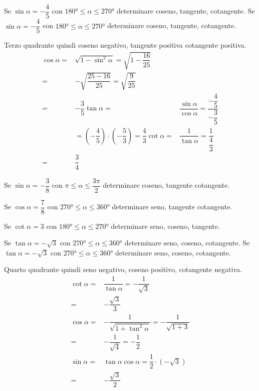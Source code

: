\begin{exercise}
	Se $\sin\alpha=-\dfrac{4}{5}$ con $\ang{180}\leq\alpha\leq\ang{270}$ determinare  coseno, tangente, cotangente.
	\tcblower	
Se $\sin\alpha=-\dfrac{4}{5}$ con $\ang{180}\leq\alpha\leq\ang{270}$ determinare  coseno, tangente, cotangente.
	
Terzo quadrante quindi coseno negativo, tangente positiva cotangente positiva.
	\begin{align*}
	\cos\alpha=&\sqrt{1-\sin^2\alpha}=\sqrt{1-\dfrac{16}{25}}\\
	=&-\sqrt{\dfrac{25-16}{25}}=\sqrt{\dfrac{9}{25}}\\
	=&-\dfrac{3}{5}
	\tan\alpha=&\dfrac{\sin\alpha}{\cos\alpha}=\dfrac{-\dfrac{4}{5}}{-\dfrac{3}{5}}\\
	&=\left(-\dfrac{4}{5}\right)\cdot\left(-\dfrac{5}{3}\right)=\dfrac{4}{3}
	\cot\alpha=&\dfrac{1}{\tan\alpha}=\dfrac{1}{\dfrac{4}{3}}\\
	=&\dfrac{3}{4}
	\end{align*}	
\end{exercise}
\begin{exercise}[no solution]
	Se $\sin\alpha=-\dfrac{3}{8}$  con $\pi\leq\alpha\leq\dfrac{3\pi}{2}$ determinare coseno, tangente cotangente.
\end{exercise}
\begin{exercise}[no solution]
	Se $\cos\alpha=\dfrac{7}{8}$  con $\ang{270}\leq\alpha\leq\ang{360}$ determinare seno, tangente cotangente.
\end{exercise}
\begin{exercise}[no solution]
	Se $\cot\alpha=3$ con $\ang{180}\leq\alpha\leq\ang{270}$ determinare seno, coseno, tangente.
\end{exercise}
\begin{exercise}
	Se $\tan\alpha=-\sqrt{3}$ con $\ang{270}\leq\alpha\leq\ang{360}$ determinare seno, coseno, cotangente.
\tcblower	
	Se $\tan\alpha=-\sqrt{3}$ con $\ang{270}\leq\alpha\leq\ang{360}$ determinare seno, coseno, cotangente.

Quarto quadrante quindi seno negativo, coseno positivo, cotangente negativa.
\begin{align*}
\cot\alpha=&\dfrac{1}{\tan\alpha}=-\dfrac{1}{\sqrt{3}}\\
=&-\dfrac{\sqrt{3}}{3}\\
\cos\alpha=&-\dfrac{1}{\sqrt{1+\tan^2\alpha}}=-\dfrac{1}{\sqrt{1+3}}\\
=&-\dfrac{1}{\sqrt{4}}=-\dfrac{1}{2}\\
\sin\alpha=&\tan\alpha\cos\alpha=\dfrac{1}{2}\cdot\left(-\sqrt{3}\right)\\
=&-\dfrac{\sqrt{3}}{2}
\end{align*}	
\end{exercise}
